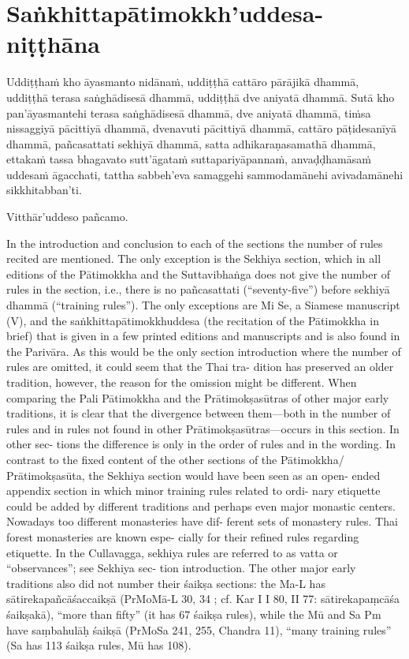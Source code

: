 
\section{Saṅkhittapātimokkh'uddesa-niṭṭhāna}
\label{sankhittapatimokkh'uddesa-nitthana}

\ifafiveversion\vspace{0.15cm}\fi
\ifninebythirteenversion\vspace{0.15cm}\fi

Uddiṭṭhaṁ kho āyasmanto nidānaṁ, uddiṭṭhā cattāro pārājikā dhammā, uddiṭṭhā terasa saṅghādisesā dhammā, uddiṭṭhā dve aniyatā dhammā. Sutā kho pan'āyasmantehi terasa saṅghādisesā dhammā, dve aniyatā dhammā, tiṁsa nissaggiyā pācittiyā dhammā, dvenavuti pācittiyā dhammā, cattāro pāṭidesanīyā dhammā, pañcasattati sekhiyā dhammā, satta adhikaraṇasamathā dhammā, ettakaṁ tassa bhagavato sutt'āgataṁ suttapariyāpannaṁ, anvaḍḍhamāsaṁ uddesaṁ āgacchati, tattha sabbeh'eva samaggehi sammodamānehi avivadamānehi sikkhitabban'ti.

Vitthār'uddeso pañcamo.

In the introduction and conclusion to each of the sections the number of rules recited are mentioned. The only exception is the Sekhiya section, which in all editions of the Pātimokkha and the Suttavibhaṅga does not give the number of rules in the section, i.e., there is no pañcasattati (“seventy-five”) before sekhiyā dhammā (“training rules”). The only exceptions are Mi Se, a Siamese manuscript (V), and the saṅkhittapātimokkhuddesa (the recitation of the Pātimokkha in brief) that is given in a few printed editions and manuscripts and is also found in the Parivāra. As this would be the only section introduction where the number of rules are omitted, it could seem that the Thai tra- dition has preserved an older tradition, however, the reason for the omission might be different. When comparing the Pali Pātimokkha and the Prātimokṣasūtras of other major early traditions, it is clear that the divergence between them—both in the number of rules and in rules not found in other Prātimokṣasūtras—occurs in this section. In other sec- tions the difference is only in the order of rules and in the wording. In contrast to the fixed content of the other sections of the Pātimokkha/ Prātimokṣasūta, the Sekhiya section would have been seen as an open- ended appendix section in which minor training rules related to ordi- nary etiquette could be added by different traditions and perhaps even major monastic centers. Nowadays too different monasteries have dif- ferent sets of monastery rules. Thai forest monasteries are known espe- cially for their refined rules regarding etiquette. In the Cullavagga, sekhiya rules are referred to as vatta or “observances”; see Sekhiya sec- tion introduction. The other major early traditions also did not number their śaikṣa sections: the Ma-L has sātirekapañcāśaccaikṣā (PrMoMā-L 30, 34 ; cf. Kar I I 80, II 77: sātirekapaṃcāśa śaikṣakā), “more than fifty” (it has 67 śaikṣa rules), while the Mū and Sa Pm have saṃbahulāḥ śaikṣā (PrMoSa 241, 255, Chandra 11), “many training rules” (Sa has 113 śaikṣa rules, Mū has 108).

